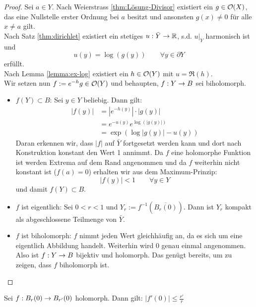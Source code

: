 \begin{proof}
  Sei $a \in Y$. Nach Weierstrass \ref{thm:Lösung-Divisor} existiert ein $g \in
  \mathcal{O}(X)$, das eine Nullstelle erster Ordnung bei $a$ besitzt und
  ansonsten $g(x) \neq 0$ für alle $x \neq a$ gilt. \\
  Nach Satz \ref{thm:dirichlet} existiert ein stetiges $u: \bar Y \rightarrow
  \mathbb{R}$, s.d. $u|_Y$ harmonisch ist und
  \[
  u(y) = \log(g(y)) \qquad \forall y \in \partial Y
  \]
  erfüllt. \\
  Nach Lemma \ref{lemma:ex-log} existiert ein $h \in \mathcal{O}(Y)$ mit $u =
  \Re(h)$. \\
  Wir setzen nun $f := e^{-h} g \in \mathcal{O}(Y)$ und behaupten, $f: Y \rightarrow
  B$ sei biholomorph.
  \begin{itemize}
  \item $f(Y) \subset B$: Sei $y \in Y$ beliebig. Dann gilt:
    \begin{align*}
      |f(y)| & = | e^{-h(y)} | \cdot | g(y)| \\
      & = e^{-u(y)} e^{\log(|g(y)|)} \\
      & = \exp(\log|g(y)| - u(y))
    \end{align*}
    Daran erkennen wir, dass $|f|$ auf $\bar Y$ fortgesetzt werden
    kann und dort nach Konstruktion konstant den Wert 1 annimmt. Da
    $f$ eine holomorphe Funktion ist werden Extrema auf dem Rand
    angenommen und da $f$ weiterhin nicht konstant ist ($f(a) = 0$)
    erhalten wir aus dem Maximum-Prinzip:
    \[
    |f(y)| < 1 \qquad \forall y \in Y
    \]
    und damit $f(Y) \subset B$.
  \item $f$ ist eigentlich: Sei $0 < r < 1$ und $Y_r :=
    f^{-1}(\overline{B_r(0)})$. 
    Dann ist $Y_r$ kompakt als abgeschlossene Teilmenge von $\bar Y$.
  \item $f$ ist biholomorph: $f$ nimmt jeden Wert gleichhäufig an, da
    es sich um eine eigentlich Abbildung handelt. Weiterhin wird $0$
    genau einmal angenommen. Also ist $f: Y \rightarrow B$ bijektiv und
    holomorph. Das genügt bereits, um zu zeigen, dass $f$ biholomorph
    ist. 

  \end{itemize}

\end{proof}

\begin{prop}
  \label{prop:kreis}
  Sei $f: B_r(0) \rightarrow B_{r'}(0)$ holomorph. Dann gilt: $|f'(0)| \leq \frac{r'}{r}$
\end{prop}

